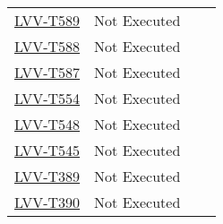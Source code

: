 \documentclass[DM,lsstdraft,STR,toc]{lsstdoc}
\begin{document}
\begin{longtable}{p{2cm}p{2.5cm}p{9cm}p{2.5cm}}
\begin{minipage}[]{9cm}
    \medskip
    \end{minipage}
    &
    \\\hline
\href{https://jira.lsstcorp.org/secure/Tests.jspa#/testCase/LVV-T589}{LVV-T589}
    & Not Executed &
    \begin{minipage}[]{9cm}
    \smallskip
    
    \medskip
    \end{minipage}
    &
    \\\hline
\href{https://jira.lsstcorp.org/secure/Tests.jspa#/testCase/LVV-T588}{LVV-T588}
    & Not Executed &
    \begin{minipage}[]{9cm}
    \smallskip
    
    \medskip
    \end{minipage}
    &
    \\\hline
\href{https://jira.lsstcorp.org/secure/Tests.jspa#/testCase/LVV-T587}{LVV-T587}
    & Not Executed &
    \begin{minipage}[]{9cm}
    \smallskip
    
    \medskip
    \end{minipage}
    &
    \\\hline
\href{https://jira.lsstcorp.org/secure/Tests.jspa#/testCase/LVV-T554}{LVV-T554}
    & Not Executed &
    \begin{minipage}[]{9cm}
    \smallskip
    
    \medskip
    \end{minipage}
    &
    \\\hline
\href{https://jira.lsstcorp.org/secure/Tests.jspa#/testCase/LVV-T548}{LVV-T548}
    & Not Executed &
    \begin{minipage}[]{9cm}
    \smallskip
    
    \medskip
    \end{minipage}
    &
    \\\hline
\href{https://jira.lsstcorp.org/secure/Tests.jspa#/testCase/LVV-T545}{LVV-T545}
    & Not Executed &
    \begin{minipage}[]{9cm}
    \smallskip
    
    \medskip
    \end{minipage}
    &
    \\\hline
\href{https://jira.lsstcorp.org/secure/Tests.jspa#/testCase/LVV-T389}{LVV-T389}
    & Not Executed &
    \begin{minipage}[]{9cm}
    \smallskip
    
    \medskip
    \end{minipage}
    &
    \\\hline
\href{https://jira.lsstcorp.org/secure/Tests.jspa#/testCase/LVV-T390}{LVV-T390}
    & Not Executed &
    \begin{minipage}[]{9cm}
    \smallskip
    

\end{minipage}
\end{longtable}
\end{document}
